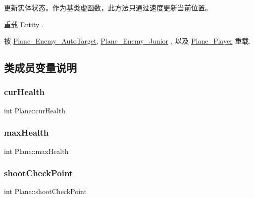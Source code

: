 更新实体状态。作为基类虚函数，此方法只通过速度更新当前位置。 



重载 \hyperlink{class_entity_a00b6eeaf99b35c8f8b10b5fbfc1baf4f}{Entity} .



被 \hyperlink{class_plane___enemy___auto_target_acae2a6f38bdc71d17188e2b7711f4d5b}{Plane\+\_\+\+Enemy\+\_\+\+Auto\+Target}, \hyperlink{class_plane___enemy___junior_a686e46c9927793dd07235cac72d52405}{Plane\+\_\+\+Enemy\+\_\+\+Junior} , 以及 \hyperlink{class_plane___player_ae68c08ce11fad9fd164c00eb4db6b348}{Plane\+\_\+\+Player} 重载.



\subsection{类成员变量说明}
\mbox{\label{class_plane_a0434f35fe3f56acb865e51c042e43df8}} 
\subsubsection{\texorpdfstring{cur\+Health}{curHealth}}
{\footnotesize\ttfamily int Plane\+::cur\+Health}

\mbox{\label{class_plane_ac39ded6721a8137c4a8044adfbfb8a6c}} 
\subsubsection{\texorpdfstring{max\+Health}{maxHealth}}
{\footnotesize\ttfamily int Plane\+::max\+Health}

\mbox{\label{class_plane_a36cb09c56fbf7b8c28506d8dd70f07cb}} 
\subsubsection{\texorpdfstring{shoot\+Check\+Point}{shootCheckPoint}}
{\footnotesize\ttfamily int Plane\+::shoot\+Check\+Point\hspace{0.3cm}{\ttfamily [protected]}}

